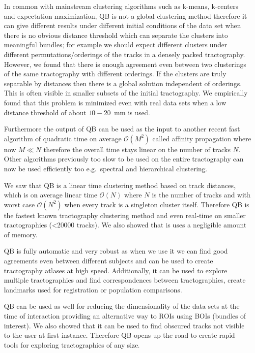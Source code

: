 \documentclass{bioinfo}
\begin{document}
In common with mainstream clustering algorithms such as k-means,
k-centers and expectation maximization, QB is not a global clustering
method therefore it can give different results under different initial
conditions of the data set when there is no obvious distance threshold
which can separate the clusters into meaningful bundles; for example we
should expect different clusters under different permutations/orderings
of the tracks in a densely packed tractography. However, we found that
there is enough agreement even between two clusterings of the same
tractography with different orderings. If the clusters are truly
separable by distances then there is a global solution independent of
orderings. This is often visible in smaller subsets of the initial
tractography. We empirically found that this problem is minimized even
with real data sets when a low distance threshold of about $10-20$~mm is
used.

Furthermore the output of QB can be used as the input to another recent
fast algorithm of quadratic time on average $\mathcal{O}(M^{2})$ called
affinity propagation where now $M\ll N$ therefore the overall time stays
linear on the number of tracks $N$. Other algorithms previously too slow
to be used on the entire tractography can now be used efficiently too
e.g.~spectral and hierarchical clustering.

We saw that QB is a linear time clustering method based on track
distances, which is on average linear time $\mathcal{O}(N)$ where $N$ is
the number of tracks and with worst case $\mathcal{O}(N^{2})$ when every
track is a singleton cluster itself. Therefore QB is the fastest known
tractography clustering method and even real-time on smaller
tractographies (<\num{20000} tracks). We also showed that is uses a
negligible amount of memory.

QB is fully automatic and very robust as when we use it we can find good
agreements even between different subjects and can be used to create
tractography atlases at high speed. Additionally, it can be used to
explore multiple tractographies and find correspondences between
tractographies, create landmarks used for registration or population
comparisons.

QB can be used as well for reducing the dimensionality of the data sets
at the time of interaction providing an alternative way to ROIs using
BOIs (bundles of interest). We also showed that it can be used to find
obscured tracks not visible to the user at first instance. Therefore QB
opens up the road to create rapid tools for exploring tractographies of
any size.
\end{document}
